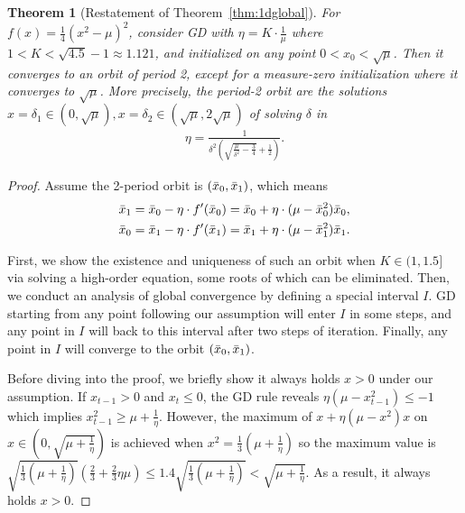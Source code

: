 \documentclass{article}
\theoremstyle{plain}
\newtheorem{theorem}{Theorem}
\theoremstyle{remark}
\begin{document}
\begin{theorem}[Restatement of Theorem~\ref{thm:1dglobal}]
For $f(x)=\frac{1}{4}(x^2-\mu)^2$, consider GD with $\eta=K\cdot\frac{1}{\mu}$ where $1<K< \sqrt{4.5}-1\approx 1.121$, and initialized on any point $0<x_0<\sqrt{\mu}$. Then it converges to an orbit of period 2, except for a measure-zero initialization where it converges to $\sqrt{\mu}$. More precisely, the period-2 orbit are the solutions $x=\delta_1\in(0,\sqrt{\mu}), x=\delta_2\in(\sqrt{\mu},2\sqrt{\mu})$ of solving $\delta$ in
\begin{align}
    \eta  = \frac{1}{\delta^2\left( \sqrt{\frac{\mu}{\delta^2}-\frac{3}{4}} +\frac{1}{2}\right)}.
\end{align}
\end{theorem}

\begin{proof}
Assume the 2-period orbit is $(\Bar{x}_0, \Bar{x}_1)$, which means
\begin{align*}
    \Bar{x}_1 &= \Bar{x}_0 - \eta\cdot f'(\Bar{x}_0)
    =\Bar{x}_0 + \eta\cdot(\mu-\Bar{x}_0^2)\Bar{x}_0
    ,\\
    \Bar{x}_0 &= \Bar{x}_1 - \eta\cdot f'(\Bar{x}_1)
    =\Bar{x}_1 + \eta\cdot(\mu-\Bar{x}_1^2)\Bar{x}_1.
\end{align*}

First, we show the existence and uniqueness of such an orbit when $K\in(1,1.5]$ via solving a high-order equation, some roots of which can be eliminated. 
Then, we conduct an analysis of global convergence by defining a special interval $I$. GD starting from any point following our assumption will enter $I$ in some steps, and any point in $I$ will back to this interval after two steps of iteration. Finally, any point in $I$ will converge to the orbit $(\Bar{x}_0, \Bar{x}_1)$.

Before diving into the proof, we briefly show it always holds $x>0$ under our assumption. If $x_{t-1}>0$ and $x_{t}\le 0$, the GD rule reveals $\eta(\mu-x_{t-1}^2)\le -1$ which implies $x_{t-1}^2 \ge \mu+\frac{1}{\eta}$. However, the maximum of $x+\eta(\mu-x^2)x$ on $x\in(0, \sqrt{\mu+\frac{1}{\eta}})$ is achieved when $x^2=\frac{1}{3}(\mu+\frac{1}{\eta})$ so the maximum value is $\sqrt{\frac{1}{3}(\mu+\frac{1}{\eta})}(\frac{2}{3}+\frac{2}{3}\eta\mu)\le 1.4\sqrt{\frac{1}{3}(\mu+\frac{1}{\eta})}<\sqrt{\mu+\frac{1}{\eta}}$. As a result, it always holds $x>0$.


\end{proof}
\end{document}
